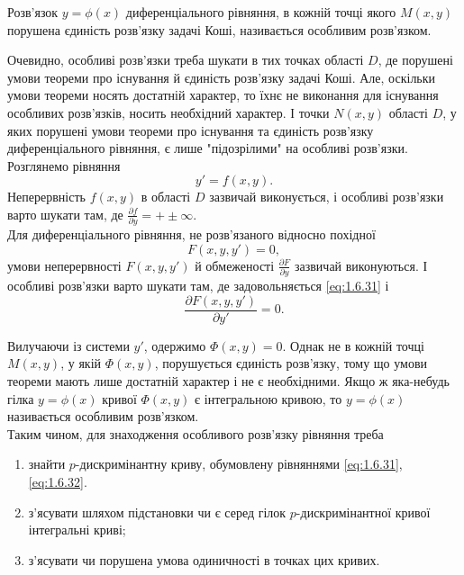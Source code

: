 \begin{definition}
	Розв’язок $y = \phi(x)$ диференціального рівняння, в кожній точці якого $M(x,y)$ порушена єдиність розв’язку задачі Коші, називається особливим розв’язком. 
\end{definition}

Очевидно, особливі розв’язки треба шукати в тих точках області $D$, де порушені умови теореми про існування й єдиність розв’язку задачі Коші. Але, оскільки умови теореми носять достатній характер, то їхнє не виконання для існування особливих розв’язків, носить необхідний характер. І точки $N(x,y)$ області $D$, у яких порушені умови теореми про існування та єдиність розв’язку диференціального рівняння, є лише "підозрілими" на особливі розв’язки. \\

Розглянемо рівняння 
\begin{equation}
	\label{eq:1.6.30}
	y' = f(x,y).
\end{equation}
Неперервність $f(x,y)$ в області $D$ зазвичай виконується, і особливі розв’язки варто шукати там, де $\frac{\partial f}{\partial y} = +\pm \infty$. \\

Для диференціального рівняння, не розв’язаного відносно похідної 
\begin{equation}
	\label{eq:1.6.31}
	F(x, y, y') = 0,
\end{equation}
умови неперервності $F(x,y,y')$ й обмеженості $\frac{\partial F}{\partial y}$ зазвичай виконуються. І особливі розв’язки варто шукати там, де задовольняється \eqref{eq:1.6.31} і 
\begin{equation}
	\label{eq:1.6.32}
	\frac{\partial F(x,y,y')}{\partial y'} = 0.
\end{equation}

Вилучаючи із системи $y'$, одержимо $\Phi(x,y)=0$. Однак не в кожній точці $M(x,y)$, у якій $\Phi(x,y)$, порушується єдиність розв’язку, тому що умови теореми мають лише достатній характер і не є необхідними. Якщо ж яка-небудь гілка $y=\phi(x)$ кривої $\Phi(x,y)$ є інтегральною кривою, то $y=\phi(x)$ називається особливим розв’язком. \\

Таким чином, для знаходження особливого розв’язку рівняння   треба
\begin{enumerate}
	\item знайти $p$-дискримінантну криву, обумовлену рівняннями \eqref{eq:1.6.31}, \eqref{eq:1.6.32}.
	\item з'ясувати шляхом підстановки чи є серед гілок $p$-дискримінантної кривої інтегральні криві;
	\item з'ясувати чи порушена умова одиничності в точках цих кривих.
\end{enumerate}
